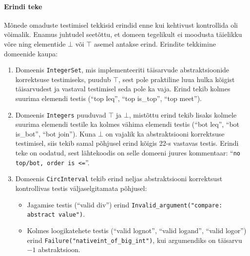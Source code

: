 \documentclass[../thesis.tex]{subfiles}
\begin{document}
\paragraph{Erindi teke}
Mõnede omaduste testimisel tekkisid erindid enne kui kehtivust kontrollida oli võimalik. Enamus juhtudel seetõttu, et domeen tegelikult ei moodusta täielikku võre ning elementide $\bot$ või $\top$ asemel antakse erind. Erindite tekkimine domeenide kaupa:
\begin{enumerate}
	\item Domeenis \texttt{IntegerSet}, mis implementeeriti täisarvude abstraktsioonide korrektsuse testimiseks, puudub $\top$, sest pole praktiline luua hulka kõigist täisarvudest ja vastaval testimisel seda pole ka vaja. Erind tekib kolmes suurima elemendi testis (\enquote{top leq}, \enquote{top is\_top}, \enquote{top meet}).

	\item Domeenis \texttt{Integers} puuduvad $\top$ ja $\bot$, mistõttu erind tekib lisaks kolmele suurima elemendi testile ka kolmes vähima elemendi testis (\enquote{bot leq}, \enquote{bot is\_bot}, \enquote{bot join}). Kuna $\bot$ on vajalik ka abstraktsiooni korrektsuse testimisel, siis tekib samal põhjusel erind kõigis 22-s vastavas testis. Erindi teke on oodatud, sest lähtekoodis on selle domeeni juures kommentaar: \enquote{\texttt{no top/bot, order is <=}}.

	\item Domeenis \texttt{CircInterval} tekib erind neljas abstraktsiooni korrektsust kontrollivas testis väljaselgitamata põhjusel:
	\begin{itemize}[nosep]
		\item Jagamise testis (\enquote{valid div}) erind \texttt{Invalid\_argument("compare: abstract value")}.

		\item Kolmes loogikatehete testis (\enquote{valid lognot}, \enquote{valid logand}, \enquote{valid logor}) erind \texttt{Failure("nativeint\_of\_big\_int")}, kui argumendiks on täisarvu $-1$ abstraktsioon.
	\end{itemize}
\end{enumerate}
\end{document}
